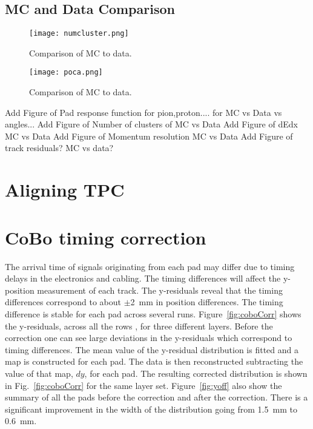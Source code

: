\subsection{MC and Data Comparison}

\begin{figure}[!hbt]
\texttt{[image: numcluster.png]}
\caption{Comparison of MC to data.}
\label{fig:clustcomp}
\end{figure}


\begin{figure}[!hbt]
\texttt{[image: poca.png]}
\caption{Comparison of MC to data.}
\label{fig:pocacomp}
\end{figure}


Add Figure of Pad response function for pion,proton.... for MC vs Data vs angles...
Add Figure of Number of clusters of MC vs Data
Add Figure of dEdx MC vs Data
Add Figure of Momentum resolution MC vs Data
Add Figure of track residuals? MC vs data?


\section{Aligning TPC}

\section{CoBo timing correction}

The arrival time of signals originating from each pad may differ due to timing delays in the electronics and cabling. The timing differences will affect the y-position measurement of each track. The y-residuals reveal that the timing differences correspond to about $\pm$\SI{2}{\milli\metre} in position differences. The timing difference is stable for each pad across several runs. Figure~\ref{fig:coboCorr} shows the y-residuals, across all the rows , for three different layers. Before the correction one can see large deviations in the y-residuals which correspond to timing differences. The mean value of the y-residual distribution is fitted and a map is constructed for each pad. The data is then reconstructed subtracting the value of that map, $dy$, for each pad. The resulting corrected distribution is shown in Fig.~\ref{fig:coboCorr} for the same layer set. Figure~\ref{fig:yoff} also show the summary of all the pads before the correction and after the correction. There is a significant improvement in the width of the distribution going from \SI{1.5}{\milli\metre} to \SI{0.6}{\milli\metre}. 

